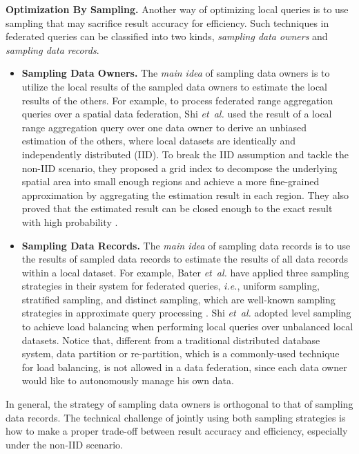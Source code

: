 \documentclass[11pt]{article}
\newcommand{\etal}{\textit{et~al.}\xspace}
\newcommand{\ie}{\textit{i.e.},\xspace}
\newcommand{\fakeparagraph}[1]{\vspace{1mm}\noindent\textbf{#1.}}
\begin{document}
\fakeparagraph{Optimization By Sampling}
Another way of optimizing local queries is to use sampling that may sacrifice result accuracy for efficiency.
Such techniques in federated queries can be classified into two kinds, \textit{sampling data owners} and \textit{sampling data records}.
\begin{itemize}
	\item \textbf{Sampling Data Owners.}
	The \textit{main idea} of sampling data owners is to utilize the local results of the sampled data owners to estimate the local results of the others. 
	For example, to process federated range aggregation queries over a spatial data federation, Shi \etal \cite{ref_shi2021efficient} used the result of a local range aggregation query over one data owner to derive an unbiased estimation of the others, where local datasets are identically and independently distributed (IID). 
	To break the IID assumption and tackle the non-IID scenario, they proposed a grid index to decompose the underlying spatial area into small enough regions and achieve a more fine-grained approximation by aggregating the estimation result in each region.
	They also proved that the estimated result can be closed enough to the exact result with high probability \cite{ref_shi2021efficient}.
	
	\item \textbf{Sampling Data Records.}
	The \textit{main idea} of sampling data records is to use the results of sampled data records to estimate the results of all data records within a local dataset. 
	For example, Bater \etal \cite{ref_bater2020saqe} have applied three sampling strategies in their system for \SAQE federated queries, \ie uniform sampling, stratified sampling, and distinct sampling, which are well-known sampling strategies in approximate query processing \cite{DBLP:conf/sigmod/ChaudhuriDK17}. 
	Shi \etal \cite{ref_shi2021efficient} adopted level sampling to achieve load balancing when performing local queries over unbalanced local datasets. Notice that, different from a traditional distributed database system,
	data partition or re-partition, which is a commonly-used technique for load balancing, is not allowed in a data federation, since each data owner would like to autonomously manage his own data.
\end{itemize} 

In general, the strategy of sampling data owners is orthogonal to that of sampling data records. 
The technical challenge of jointly using both sampling strategies is how to make a proper trade-off between result accuracy and efficiency, especially under the non-IID scenario.
\end{document}
